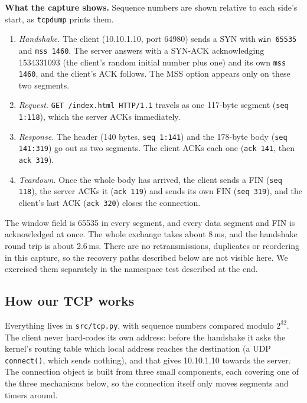 \documentclass[10pt,a4paper]{article}
\newcommand{\cmd}[1]{\texttt{#1}}
\begin{document}
\begin{aside}
\textbf{What the capture shows.} Sequence numbers are shown relative to each side's start, as
\cmd{tcpdump} prints them.
\begin{enumerate}
\item \emph{Handshake.} The client (10.10.1.10, port 64980) sends a SYN with \cmd{win 65535} and
  \cmd{mss 1460}. The server answers with a SYN-ACK acknowledging 1534331093 (the client's random initial number plus one)
  and its own \cmd{mss 1460}, and the client's ACK follows. The MSS option appears only on these two segments.
\item \emph{Request.} \cmd{GET /index.html HTTP/1.1} travels as one 117-byte segment (\cmd{seq 1:118}), which the server ACKs
  immediately.
\item \emph{Response.} The header (140 bytes, \cmd{seq 1:141}) and the 178-byte body (\cmd{seq 141:319}) go out as
  two segments. The client ACKs each one (\cmd{ack 141}, then \cmd{ack 319}).
\item \emph{Teardown.} Once the whole body has arrived, the client sends a FIN (\cmd{seq 118}), the server ACKs it
  (\cmd{ack 119}) and sends its own FIN (\cmd{seq 319}), and the client's last ACK (\cmd{ack 320}) closes the connection.
\end{enumerate}
The window field is 65535 in every segment, and every data segment and FIN is acknowledged
at once. The whole exchange takes about 8\,ms, and the handshake round trip is about 2.6\,ms. There are no
retransmissions, duplicates or reordering in this capture, so the recovery paths described below are
not visible here. We exercised them separately in the namespace test described at the end.
\end{aside}

\subsection*{How our TCP works}
Everything lives in \cmd{src/tcp.py}, with sequence numbers compared modulo $2^{32}$. The
client never hard-codes its own address: before the handshake it asks the kernel's routing table which local
address reaches the destination (a UDP \cmd{connect()}, which sends nothing), and that gives 10.10.1.10
towards the server. The connection object is built from three small components, each covering one of the three
mechanisms below, so the connection itself only moves segments and timers around.
\end{document}
